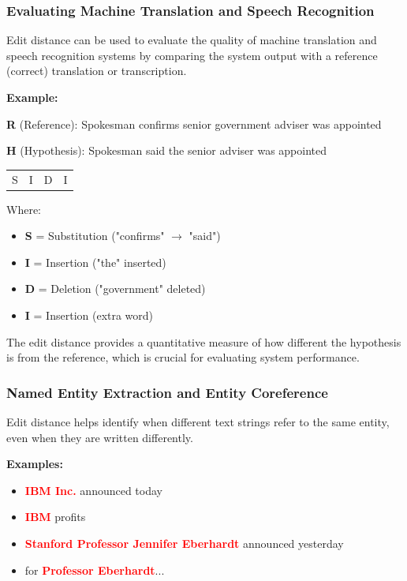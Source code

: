 \documentclass[11pt,a4paper]{article}
\theoremstyle{definition}
\theoremstyle{plain}
\theoremstyle{remark}
\begin{document}
\subsubsection{Evaluating Machine Translation and Speech Recognition}

Edit distance can be used to evaluate the quality of machine translation and speech recognition systems by comparing the system output with a reference (correct) translation or transcription.

\textbf{Example:}

\textbf{R} (Reference): Spokesman confirms senior government adviser was appointed

\textbf{H} (Hypothesis): Spokesman said the senior adviser was appointed

\begin{center}
\begin{tabular}{cccc}
S & I & D & I \\
\end{tabular}
\end{center}

Where:
\begin{itemize}
    \item \textbf{S} = Substitution ("confirms" $\rightarrow$ "said")
    \item \textbf{I} = Insertion ("the" inserted)
    \item \textbf{D} = Deletion ("government" deleted)
    \item \textbf{I} = Insertion (extra word)
\end{itemize}

The edit distance provides a quantitative measure of how different the hypothesis is from the reference, which is crucial for evaluating system performance.

\subsubsection{Named Entity Extraction and Entity Coreference}

Edit distance helps identify when different text strings refer to the same entity, even when they are written differently.

\textbf{Examples:}
\begin{itemize}
    \item \textcolor{red}{\textbf{IBM Inc.}} announced today
    \item \textcolor{red}{\textbf{IBM}} profits
    \item \textcolor{red}{\textbf{Stanford Professor Jennifer Eberhardt}} announced yesterday
    \item for \textcolor{red}{\textbf{Professor Eberhardt}}...
\end{itemize}
\end{document}
